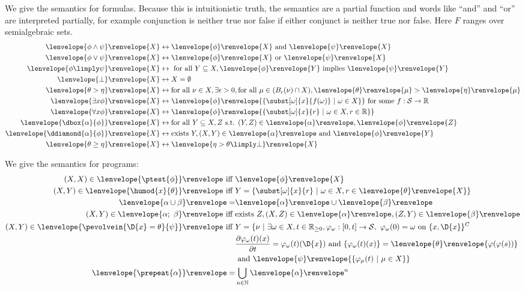 \documentclass[12pt]{cmuthesis}
\theoremstyle{definition}
\theoremstyle{remark}
\newcommand{\ivr}{\psi}
\newcommand{\allstate}{\mathcal{S}}
\newcommand{\lequiv}{\leftrightarrow}
\newcommand{\om}{\omega}
\newcommand{\tint}[2]{\lenvelope{#1}\renvelope{#2}}
\newcommand{\fint}[1]{\lenvelope{#1}\renvelope}
\newcommand{\pint}[1]{\lenvelope{#1}\renvelope} %
\begin{document}
We give the semantics for formulas.
Because this is intuitionistic truth, the semantics are a partial function and words like ``and'' and ``or'' are interpreted partially, for example conjunction is neither true nor false if either conjunct is neither true nor false.
Here $F$ ranges over semialgebraic sets.
\begin{align*}
  \fint{\phi \land \psi}{X}     &\lequiv \fint{\phi}{X}\text{ and }\fint{\psi}{X}\\
  \fint{\phi \lor \psi}{X}      &\lequiv \fint{\phi}{X}\text{ or }\fint{\psi}{X}\\
  \fint{\phi \limply \psi}{X}   &\lequiv \text{ for all }Y \subseteq X, \fint{\phi}{Y}\text{ implies }\fint{\psi}{Y}\\
  \fint{\bot}{X}                &\lequiv X = \emptyset\\
  \fint{\theta > \eta}{X}       &\lequiv \text{for all }\nu \in X, \exists \epsilon > 0, \text{for all } \mu \in (B_\epsilon(\nu) \cap X), \tint{\theta}{\mu} > \tint{\eta}{\mu}\\
  \fint{\exists{x}{\phi}}{X}    &\lequiv \fint{\phi}{\{\subst[\om]{x}{f(\om)}~|~\om \in X\}} \text{ for some $f:\allstate \to \mathbb{R}$}\\
  \fint{\forall{x}{\phi}}{X}    &\lequiv \fint{\phi}{\{\subst[\om]{x}{r}~|~\om \in X,  r \in \mathbb{R}\}}\\
  \fint{\dbox{\alpha}{\phi}}{X} &\lequiv \text{for all }Y \subseteq X, Z \text{ s.t. }(Y,Z) \in \pint{\alpha}, \fint{\phi}{Z}\\
  \fint{\ddiamond{\alpha}{\phi}}{X} &\lequiv \text{exists }Y, (X,Y)\in\pint{\alpha}\text{ and }\fint{\phi}{Y}\\
  \fint{\theta \geq \eta}{X}    &\lequiv \fint{\eta > \theta \limply \bot}{X}%
\end{align*}

We give the semantics for programs:
\begin{align*}
  (X,X) \in \pint{\ptest{\phi}}\text{ iff }&\fint{\phi}{X} \\
  (X,Y) \in \pint{\humod{x}{\theta}} \text{ iff }& Y = \{\subst[\om]{x}{r}~|~\om \in X, r \in \tint{\theta}{X}\}\\
  \pint{\alpha \cup \beta} =& \pint{\alpha} \cup \pint{\beta}\\
  (X,Y) \in \pint{\alpha;~\beta} \text{ iff }& \text{exists }Z, (X,Z) \in \pint{\alpha}, (Z,Y) \in \pint{\beta}\\
  (X,Y) \in \pint{\pevolvein{\D{x}=\theta}{\ivr}}\text{ iff }& Y = \{\nu~|~\exists \om \in X, t \in \mathbb{R}_{\geq0}, \varphi_\om:[0,t]\to\allstate,~\varphi_\om(0)=\om\text{ on }\{x,\D{x}\}^C\\
   &\frac{\partial \varphi_\om(t)(x)}{\partial t}= \varphi_\om(t)(\D{x})\text{ and } \{\varphi_\om(t)(x)\}=\tint{\theta}{\varphi(\varphi(s))}\\
   &\text{ and }\fint{\ivr}{\{\varphi_\mu(t)~|~\mu\in X}\}\\
  \pint{\prepeat{\alpha}} =& \bigcup_{n\in\mathbb{N}} \pint{\alpha}^n
\end{align*}
\end{document}
